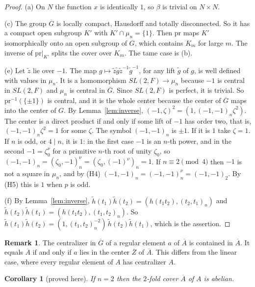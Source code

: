\documentclass[12pt,letterpaper]{article}
\numberwithin{equation}{section}
\newtheorem{corollary}[theorem]{Corollary}
\theoremstyle{definition}
\newtheorem{xremark}[theorem]{Remark}
\newcommand{\proved}{proved here}
\newcommand{\bG}{\overline{G}}
\newcommand{\bA}{\overline{A}}
\newcommand{\bZ}{\overline{Z}}
\newcommand{\hl}{\tilde h}
\newcommand{\pr}{\mathrm{pr}}
\begin{document}
\begin{proof}
(a) On $N$ the function $x$ is identically $1$, so $\beta$ is trivial on $N\times N$.

(c) The group $\bG$ is locally compact, Hausdorff and totally disconnected.  So it has a
compact open subgroup $K'$ with $K'\cap\mu_n=\{1\}$.  Then $\pr$ maps $K'$ isomorphically
onto an open subgroup of $G$, which contains $K_m$ for large $m$.  The inverse of
$\pr|_{K'}$ splits the cover over $K_m$.  The tame case is (b).

(e) Let $\tilde z$ lie over $-1$.  The map $g\mapsto\tilde z\tilde g\tilde z^{-1}\tilde g^{-1}$,
for any lift $\tilde g$ of $g$, is well defined with values in $\mu_n$.  It is a
homomorphism $SL(2,F)\to\mu_n$ because $-1$ is central in $SL(2,F)$ and $\mu_n$ is central
in $\bG$.  Since $SL(2,F)$ is perfect, it is trivial.  So $\pr^{-1}(\{\pm1\})$ is central,
and it is the whole center because the center of $\bG$ maps into the center of $G$.  By
Lemma~\ref{lem:inverse}, $(-1,\zeta)^2=(1,(-1,-1)_n\zeta^2)$.  The center is a direct
product if and only if some lift of $-1$ has order two, that is, $(-1,-1)_n\zeta^2=1$ for
some $\zeta$.  The symbol $(-1,-1)_n$ is $\pm1$.  If it is $1$ take $\zeta=1$.  If $n$ is
odd, or $4\mid n$, it is $1$: in the first case $-1$ is an $n$-th power, and in the second
$-1=\zeta_0^{\nu}$ for a primitive $n$-th root of unity $\zeta_0$, so
$(-1,-1)_n=(\zeta_0,-1)_n^{\nu}=(\zeta_0,(-1)^\nu)_n=1$.  If $n\equiv2\pmod4$ then $-1$ is
not a square in $\mu_n$, and by (H4) $(-1,-1)_n=(-1,-1)_n^{\nu}=(-1,-1)_2$.  By (H5) this is
$1$ when $p$ is odd.

(f) By Lemma~\ref{lem:inverse}, $\hl(t_1)\hl(t_2)=(h(t_1t_2),(t_2,t_1)_n)$ and
$\hl(t_2)\hl(t_1)=(h(t_1t_2),(t_1,t_2)_n)$.  So
$\hl(t_1)\hl(t_2)=(1,(t_1,t_2)_n^{-2})\,\hl(t_2)\hl(t_1)$, which is the assertion.
\end{proof}

\begin{xremark}
The centralizer in $\bG$ of a regular element $a$ of $\bA$ is contained in $\bA$.  It
equals $\bA$ if and only if $a$ lies in the center $\bZ$ of $\bA$.  This differs from the
linear case, where every regular element of $A$ has centralizer $A$.
\end{xremark}

\begin{corollary}[\proved]\label{cor:n2}
If $n=2$ then the $2$-fold cover $\bA$ of $A$ is abelian.
\end{corollary}
\end{document}
